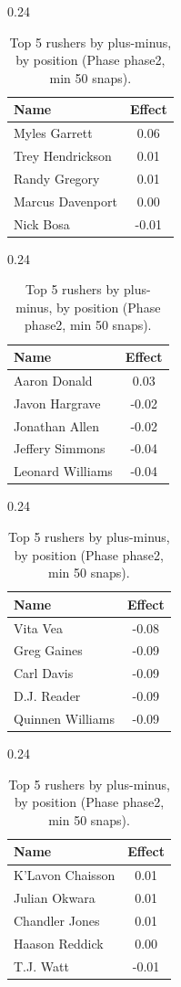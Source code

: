 \begin{table}[h!]
\centering
\begin{subtable}{0.24\textwidth}
\centering
\footnotesize
\begin{tabular}{lc}
\toprule
Name & Effect \\
\midrule
Myles Garrett & 0.06 \\
Trey Hendrickson & 0.01 \\
Randy Gregory & 0.01 \\
Marcus Davenport & 0.00 \\
Nick Bosa & -0.01 \\
\bottomrule
\end{tabular}
\caption{DE}
\end{subtable}
\hfill
\begin{subtable}{0.24\textwidth}
\centering
\footnotesize
\begin{tabular}{lc}
\toprule
Name & Effect \\
\midrule
Aaron Donald & 0.03 \\
Javon Hargrave & -0.02 \\
Jonathan Allen & -0.02 \\
Jeffery Simmons & -0.04 \\
Leonard Williams & -0.04 \\
\bottomrule
\end{tabular}
\caption{DT}
\end{subtable}
\hfill
\begin{subtable}{0.24\textwidth}
\centering
\footnotesize
\begin{tabular}{lc}
\toprule
Name & Effect \\
\midrule
Vita Vea & -0.08 \\
Greg Gaines & -0.09 \\
Carl Davis & -0.09 \\
D.J. Reader & -0.09 \\
Quinnen Williams & -0.09 \\
\bottomrule
\end{tabular}
\caption{NT}
\end{subtable}
\hfill
\begin{subtable}{0.24\textwidth}
\centering
\footnotesize
\begin{tabular}{lc}
\toprule
Name & Effect \\
\midrule
K'Lavon Chaisson & 0.01 \\
Julian Okwara & 0.01 \\
Chandler Jones & 0.01 \\
Haason Reddick & 0.00 \\
T.J. Watt & -0.01 \\
\bottomrule
\end{tabular}
\caption{OLB}
\end{subtable}
\caption{Top 5 rushers by plus-minus, by position (Phase phase2, min 50 snaps).}
\label{tab:rusher_pm_phase2_top}
\end{table}


